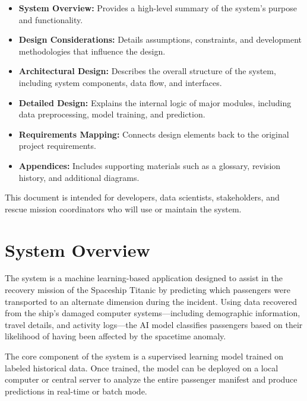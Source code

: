 \documentclass[15pt]{article}
\begin{document}
\begin{itemize}
    \item \textbf{System Overview:} Provides a high-level summary of the system’s purpose and functionality.
    \item \textbf{Design Considerations:} Details assumptions, constraints, and development methodologies that influence the design.
    \item \textbf{Architectural Design:} Describes the overall structure of the system, including system components, data flow, and interfaces.
    \item \textbf{Detailed Design:} Explains the internal logic of major modules, including data preprocessing, model training, and prediction.
    \item \textbf{Requirements Mapping:} Connects design elements back to the original project requirements.
    \item \textbf{Appendices:} Includes supporting materials such as a glossary, revision history, and additional diagrams.
\end{itemize}

This document is intended for developers, data scientists, stakeholders, and rescue mission coordinators who will use or maintain the system.

\section{System Overview}

The system is a machine learning-based application designed to assist in the recovery mission of the Spaceship Titanic by predicting which passengers were transported to an alternate dimension during the incident. Using data recovered from the ship's damaged computer systems—including demographic information, travel details, and activity logs—the AI model classifies passengers based on their likelihood of having been affected by the spacetime anomaly.

The core component of the system is a supervised learning model trained on labeled historical data. Once trained, the model can be deployed on a local computer or central server to analyze the entire passenger manifest and produce predictions in real-time or batch mode.
\end{document}
